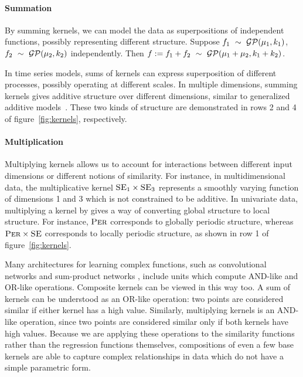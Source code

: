 \documentclass[twoside]{article}
\begin{document}
\paragraph{Summation}

By summing kernels, we can model the data as superpositions of independent functions, possibly representing different structure.
Suppose ${f_1 \ \sim\  \mathcal{GP}(\mu_1, k_1)}$, ${f_2 \ \sim\  \mathcal{GP}(\mu_2, k_2)}$ independently.
Then ${f := f_1 + f_2 \ \sim\  \mathcal{GP}(\mu_1 + \mu_2, k_1 + k_2)}$.

In time series models, sums of kernels can express superposition of different processes, possibly operating at different scales.
In multiple dimensions, summing kernels gives additive structure over different dimensions, similar to generalized additive models~\citep{hastie1990generalized}.
These two kinds of structure are demonstrated in rows 2 and 4 of figure~\ref{fig:kernels}, respectively.


\paragraph{Multiplication}

Multiplying kernels allows us to account for interactions between different input dimensions or different notions of similarity. 
For instance, in multidimensional data, the multiplicative kernel $\textsc{SE}_1 \times \textsc{SE}_3$ represents a smoothly varying function of dimensions 1 and 3 which is not constrained to be additive.
In univariate data, multiplying a kernel by \kSE{} gives a way of converting global structure to local structure. 
For instance, $\textsc{Per}$ corresponds to globally periodic structure, whereas $\textsc{Per} \times \textsc{SE}$ corresponds to locally periodic structure, as shown in row 1 of figure~\ref{fig:kernels}.

Many architectures for learning complex functions, such as convolutional networks  and sum-product networks , include units which compute AND-like and OR-like operations.
Composite kernels can be viewed in this way too. A sum of kernels can be understood as an OR-like operation: two points are considered similar if either kernel has a high value.
Similarly, multiplying kernels is an AND-like operation, since two points are considered similar only if both kernels have high values.
Because we are applying these operations to the similarity functions rather than the regression functions themselves, compositions of even a few base kernels are able to capture complex relationships in data which do not have a simple parametric form.
\end{document}
